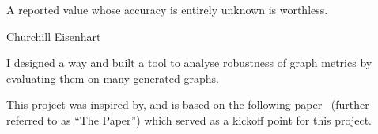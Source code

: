 \epigraph{A reported value whose accuracy is entirely unknown is worthless.}{Churchill Eisenhart~\cite{EisenhartExpressionUncertaintiesFinal1968}}

%
%


I designed a way and built a tool to analyse robustness of graph metrics by evaluating them on many generated graphs.

This project was inspired by, and is based on the following paper~\cite{Bozhilova2019} (further referred to as ``The Paper'') which served as a kickoff point for this project.
\begin{adjustwidth}{1cm}{}
    \vspace*{0.5em}\vspace*{0.5em}
\end{adjustwidth}

